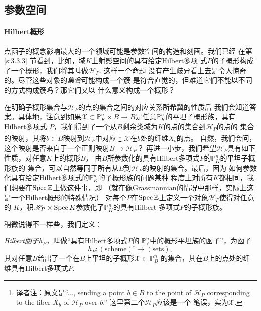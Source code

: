 \subsection{参数空间}\label{s:6.2.2}

\paragraph*{Hilbert概形}

点函子的概念影响最大的一个领域可能是参数空间的构造和刻画。我们已经
在第 \ref{s:3.3.3} 节看到，比如，域$K$上射影空间的具有给定Hilbert多项
式$P$的子概形构成了一个概形，我们将其叫做$\mathscr H_P$. 这样一个命题
没有产生歧异看上去是令人惊奇的。尽管这些对象的\emph{集合}可能构成一个簇
是符合直觉的，但难道它们不能以不同的方式构成簇吗？那它们又以
什么意义构成一个概形？

在明确子概形集合与$\mathscr H_P$的点的集合之间的对应关系所希冀的性质后
我们会知道答案。具体地，注意到如果$\mathscr X\subset \mathbb P_K^n
\times B\to B$是任意$\mathbb P_K^n$的平坦子概形族，具有Hilbert多项式
$P$，我们得到了一个从$B$剩余类域为$K$的点的集合到$\mathscr H_P$的点的
集合的映射，其将$b\in B$映射到$\mathscr H_P$中对应%
\footnote{译者注：原文是``..., sending a point 
$b\in B$ to the point of $\mathscr H_P$ corresponding to the fiber
$X_b$ of $\mathscr H_P$ over $b$.'' 这里第二个$\mathscr H_P$应该是一个
笔误，实为$\mathscr X$.}%
$\mathscr X$在$b$处的纤维$X_b$的点。
自然，我们会问，这个映射是否来自于一个正则映射$B\to \mathscr H_P$？
再进一小步，我们希望$\mathscr H_P$具有如下性质，对任意$K$上的概形$B$，
由$B$所参数化的具有Hilbert多项式$P$的$\mathbb P_K^n$的平坦子概形族的
集合，可以自然等同于所有从$B$到$\mathscr H_P$的映射的集合。最后，因为
如何参数化具有给定Hilbert多项式的$\mathbb P_K^n$的子概形族的问题某种
程度上对所有$K$都相同，我们想要在$\operatorname{Spec} \mathbb Z$上做这件事，即
（就在像Grassmannian的情况中那样，实际上这是一个Hilbert概形的特殊情况）
对每个$P$在$\operatorname{Spec} \mathbb Z$上定义一个对象$\mathscr H_P$使得对任意的
$K$，积$\mathscr H_P\times \operatorname{Spec} K$参数化了$\mathbb P_K^n$的具有Hilbert
多项式$P$的子概形族。

稍微说得不一样些，我们定义：

\begin{defi}\label{defi:6.21}
\emph{Hilbert函子}$h_P$，叫做“具有Hilbert多项式$P$的
$\mathbb P_{\mathbb Z}^n$中的概形平坦族的函子”，为函子
\[
    h_P:(\text{scheme})^\circ \to (\text{sets}),
\]
其对任意$B$给出了一个在$B$上平坦的子概形$\mathscr X\subset \mathbb P_B^n$
的集合，其在$B$上的点处的纤维具有Hilbert多项式$P$.
\end{defi}

